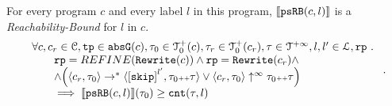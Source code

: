 \begin{theorem}
For every program ${c}$ and every label $l$ in this program,
$\llbracket \mathtt{psRB}(c, l) \rrbracket$ is a \emph{Reachability-Bound} for $l$ in $c$.
%
\[
    \begin{array}{l}
      \forall c, c_r \in \cdom, \tpath \in \absG(c), \trace_0 \in \ftdom_0(c),  \trace_r \in \ftdom_0(c_r), \trace \in \tdom, l, l' \in \ldom, \rprog \st 
      \\ \qquad
      \rprog = REFINE(\algrewrite(c))
      \land 
      \rprog = \algrewrite(c_r)
      \land
      \\ \qquad
      \land
      \Big(
      \config{c_r, \trace_0} \rightarrow^* \config{\clabel{\eskip}^{l'}, \trace_0 \tracecat \trace}
      \lor \config{c_r, \trace_0} \uparrow^{\infty} \trace_0 \tracecat \trace 
      \Big)
      \\ \qquad
      \implies \econfig{\psRB(c, l)}(\trace_0) \geq \counter(\trace, l)
    \end{array}.
  \]
\end{theorem}
%
